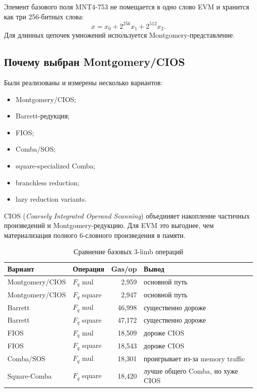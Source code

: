 \documentclass[12pt,a4paper]{article}
\begin{document}
Элемент базового поля MNT4-753 не помещается в одно слово EVM и хранится как
три 256-битных слова:
\[
    x=x_0+2^{256}x_1+2^{512}x_2.
\]
Для длинных цепочек умножений используется Montgomery-представление.

\subsection{Почему выбран Montgomery/CIOS}

Были реализованы и измерены несколько вариантов:
\begin{itemize}
    \item Montgomery/CIOS;
    \item Barrett-редукция;
    \item FIOS;
    \item Comba/SOS;
    \item square-specialized Comba;
    \item branchless reduction;
    \item lazy reduction variants.
\end{itemize}

CIOS (\emph{Coarsely Integrated Operand Scanning}) объединяет накопление
частичных произведений и Montgomery-редукцию. Для EVM это выгоднее, чем
материализация полного 6-словного произведения в памяти.

\begin{table}[htbp]
\centering
\caption{Сравнение базовых 3-limb операций}
\small
\begin{tabularx}{\linewidth}{Y l r Y}
\toprule
Вариант & Операция & Gas/op & Вывод \\
\midrule
Montgomery/CIOS & $F_q$ mul & 2,959 & основной путь \\
Montgomery/CIOS & $F_q$ square & 2,947 & основной путь \\
Barrett & $F_q$ mul & 46,998 & существенно дороже \\
Barrett & $F_q$ square & 47,172 & существенно дороже \\
FIOS & $F_q$ mul & 18,509 & дороже CIOS \\
FIOS & $F_q$ square & 18,543 & дороже CIOS \\
Comba/SOS & $F_q$ mul & 18,301 & проигрывает из-за memory traffic \\
Square-Comba & $F_q$ square & 18,420 & лучше общего Comba, но хуже CIOS \\
\bottomrule
\end{tabularx}
\end{table}
\end{document}
